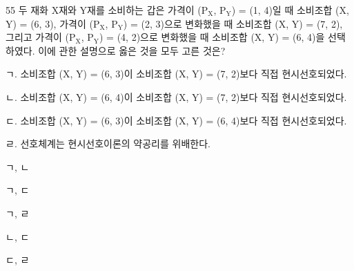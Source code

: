 \begin{question}{55}
두 재화 X재와 Y재를 소비하는 갑은 가격이 (P$_{\mathrm{X}}$, P$_{\mathrm{Y}}$) = (1, 4)일 때 소비조합 (X, Y) = (6, 3), 가격이 (P$_{\mathrm{X}}$, P$_{\mathrm{Y}}$) = (2, 3)으로 변화했을 때 소비조합 (X, Y) = (7, 2), 그리고 가격이 (P$_{\mathrm{X}}$, P$_{\mathrm{Y}}$) = (4, 2)으로 변화했을 때 소비조합 (X, Y) = (6, 4)을 선택하였다. 이에 관한 설명으로 옳은 것을 모두 고른 것은?
\begin{framedtext}
ㄱ. 소비조합 (X, Y) = (6, 3)이 소비조합 (X, Y) = (7, 2)보다 직접 현시선호되었다. \par
ㄴ. 소비조합 (X, Y) = (6, 4)이 소비조합 (X, Y) = (7, 2)보다 직접 현시선호되었다. \par
ㄷ. 소비조합 (X, Y) = (6, 3)이 소비조합 (X, Y) = (6, 4)보다 직접 현시선호되었다. \par
ㄹ. 선호체계는 현시선호이론의 약공리를 위배한다.
\end{framedtext}
\begin{choices}
  \item ㄱ, ㄴ
  \item ㄱ, ㄷ
  \item ㄱ, ㄹ
  \item ㄴ, ㄷ
  \item ㄷ, ㄹ
\end{choices}
\end{question}

